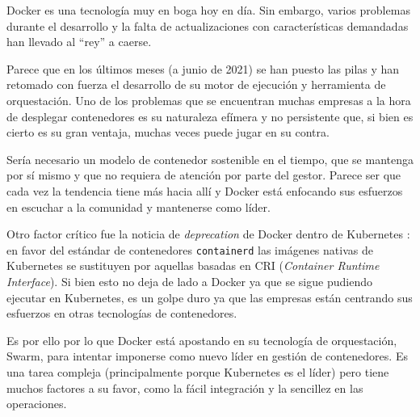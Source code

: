 Docker es una tecnología muy en boga hoy en día. Sin embargo, varios problemas
durante el desarrollo y la falta de actualizaciones con características
demandadas han llevado al ``rey'' a caerse.

Parece que en los últimos meses (a junio de 2021) se han puesto las pilas y han
retomado con fuerza el desarrollo de su motor de ejecución y herramienta de
orquestación. Uno de los problemas que se encuentran muchas empresas a la hora
de desplegar contenedores es su naturaleza efímera y no persistente que, si bien
es cierto es su gran ventaja, muchas veces puede jugar en su contra.

Sería necesario un modelo de contenedor sostenible en el tiempo, que se mantenga
por sí mismo y que no requiera de atención por parte del gestor. Parece ser que
cada vez la tendencia tiene más hacia allí y Docker está enfocando sus esfuerzos
en escuchar a la comunidad y mantenerse como líder.

Otro factor crítico fue la noticia de \textit{deprecation} de Docker dentro de
Kubernetes \autocite{DonPanicKubernetes2020}: en favor del estándar de contenedores
\texttt{containerd} las imágenes nativas de Kubernetes se sustituyen por aquellas
basadas en CRI (\textit{Container Runtime Interface}). Si bien esto no deja de lado
a Docker ya que se sigue pudiendo ejecutar en Kubernetes, es un golpe duro ya que
las empresas están centrando sus esfuerzos en otras tecnologías de contenedores.

Es por ello por lo que Docker está apostando en su tecnología de orquestación, 
Swarm, para intentar imponerse como nuevo líder en gestión de contenedores. Es
una tarea compleja (principalmente porque Kubernetes es el líder) pero tiene
muchos factores a su favor, como la fácil integración y la sencillez en las
operaciones.